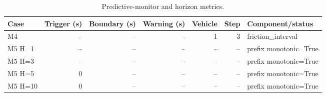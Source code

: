 \begin{table}[!t]
\centering
\scriptsize
\caption{Predictive-monitor and horizon metrics.}
\label{tab:phase2m-predictive}
\begin{tabular}{lrrrrrl}
\hline
Case & Trigger (s) & Boundary (s) & Warning (s) & Vehicle & Step & Component/status \\
\hline
M4 & -- & -- & -- & 1 & 3 & friction\_interval \\
M5 H=1 & -- & -- & -- & -- & -- & prefix monotonic=True \\
M5 H=3 & -- & -- & -- & -- & -- & prefix monotonic=True \\
M5 H=5 & 0 & -- & -- & -- & -- & prefix monotonic=True \\
M5 H=10 & 0 & -- & -- & -- & -- & prefix monotonic=True \\
\hline
\end{tabular}
\end{table}
